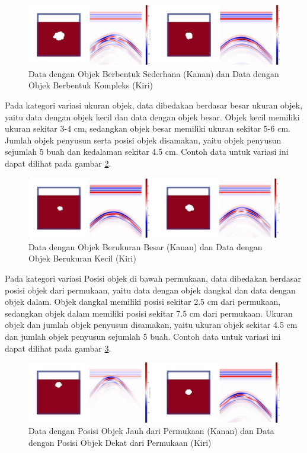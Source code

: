 \begin{figure}[ht]
  \centering
  \includegraphics[scale=0.4]{gambar/variasi kompleksitas.png}
  \caption{Data dengan Objek Berbentuk Sederhana (Kanan) dan Data dengan Objek Berbentuk Kompleks (Kiri)}
  \label{fig:kompleksData}
\end{figure}

Pada kategori variasi ukuran objek, data dibedakan berdasar besar ukuran objek, yaitu data dengan objek kecil dan data dengan objek besar. 
Objek kecil memiliki ukuran sekitar 3-4 cm, sedangkan objek besar memiliki ukuran sekitar 5-6 cm. 
Jumlah objek penyusun serta posisi objek disamakan, yaitu objek penyusun sejumlah 5 buah dan kedalaman sekitar 4.5 cm. 
Contoh data untuk variasi ini dapat dilihat pada gambar \ref{fig:ukuranData}.

\begin{figure}[ht]
  \centering
  \includegraphics[scale=0.4]{gambar/variasi ukuran.png}
  \caption{Data dengan Objek Berukuran Besar (Kanan) dan Data dengan Objek Berukuran Kecil (Kiri)}
  \label{fig:ukuranData}
\end{figure}

Pada kategori variasi Posisi objek di bawah permukaan, data dibedakan berdasar posisi objek dari permukaan, yaitu data dengan objek dangkal dan data dengan objek dalam. 
Objek dangkal memiliki posisi sekitar 2.5 cm dari permukaan, sedangkan objek dalam memiliki posisi sekitar 7.5 cm dari permukaan. 
Ukuran objek dan jumlah objek penyusun disamakan, yaitu ukuran objek sekitar 4.5 cm dan jumlah objek penyusun sejumlah 5 buah. 
Contoh data untuk variasi ini dapat dilihat pada gambar \ref{fig:posisiData}.

\begin{figure}[ht]
  \centering
  \includegraphics[scale=0.4]{gambar/variasi kedalaman.png}
  \caption{Data dengan Posisi Objek Jauh dari Permukaan (Kanan) dan Data dengan Posisi Objek Dekat dari Permukaan (Kiri)}
  \label{fig:posisiData}
\end{figure}

